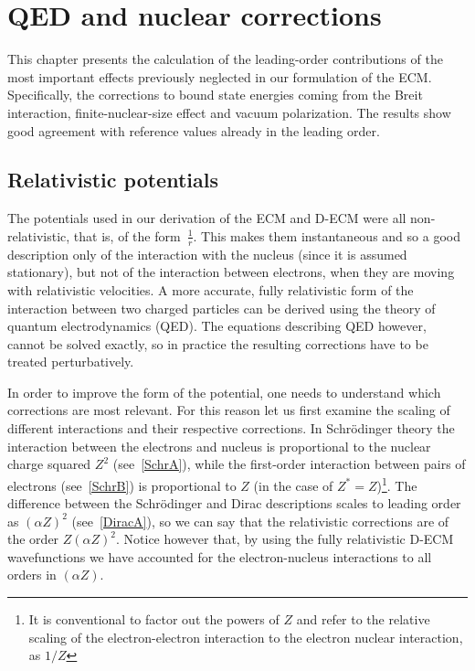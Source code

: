 \chapter{QED and nuclear corrections}
\label{ch:Improvements}

This chapter presents the calculation of the leading-order contributions of the most important effects previously neglected in our formulation of the ECM. Specifically, the corrections to bound state energies coming from the Breit interaction, finite-nuclear-size effect and vacuum polarization. The results show good agreement with reference values already in the leading order.  

\section{Relativistic potentials}

The potentials used in our derivation of the ECM and D-ECM were all non-relativistic, that is, of the form~$\frac{1}{r}$. This makes them instantaneous and so a good description only of the interaction with the nucleus (since it is assumed stationary), %
 but not of the interaction between electrons, when they are moving with relativistic velocities. A more accurate, fully relativistic form of the interaction between two charged particles can be derived using the theory of quantum electrodynamics (QED). The equations describing QED however, cannot be solved exactly, so in practice the resulting corrections have to be treated perturbatively. 
 
 In order to improve the form of the potential, one needs to understand which corrections are most relevant. For this reason let us first examine the scaling of different interactions and their respective corrections. In Schr\"odinger theory the interaction between the electrons and nucleus is proportional to the nuclear charge squared $Z^2$ (see~\eqref{SchrA}), while the first-order interaction between pairs of electrons (see~\eqref{SchrB}) is proportional to $Z$ (in the case of $Z^*=Z$)\footnote{It is conventional to factor out the powers of $Z$ and refer to the relative scaling of the electron-electron interaction to the electron nuclear interaction, as $1/Z$}. The difference between the Schr\"odinger and Dirac descriptions scales to leading order as $(\alpha Z)^2$ (see~\eqref{DiracA}), so we can say that the relativistic corrections are of the order $Z(\alpha Z)^2$. Notice however that, by using the fully relativistic D-ECM wavefunctions we have accounted for the electron-nucleus interactions to all orders in $(\alpha Z)$. 
 
